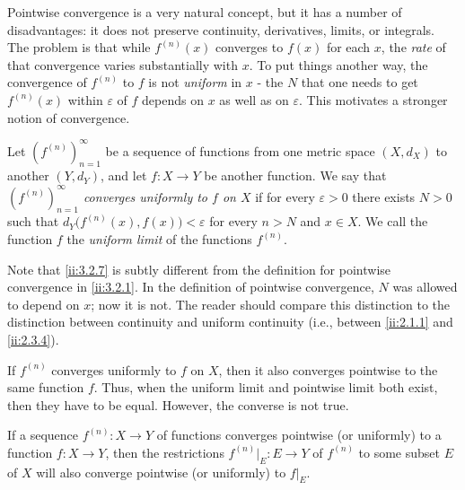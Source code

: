 \begin{note}
  Pointwise convergence is a very natural concept, but it has a number of disadvantages:
  it does not preserve continuity, derivatives, limits, or integrals.
  The problem is that while \(f^{(n)}(x)\) converges to \(f(x)\) for each \(x\), the \emph{rate} of that convergence varies substantially with \(x\).
  To put things another way, the convergence of \(f^{(n)}\) to \(f\) is not \emph{uniform} in \(x\)
  - the \(N\) that one needs to get \(f^{(n)}(x)\) within \(\varepsilon\) of \(f\) depends on \(x\) as well as on \(\varepsilon\).
  This motivates a stronger notion of convergence.
\end{note}

\setcounter{thm}{6}
\begin{defn}\label{ii:3.2.7}
  Let \((f^{(n)})_{n = 1}^\infty\) be a sequence of functions from one metric space \((X, d_X)\) to another \((Y, d_Y)\), and let \(f : X \to Y\) be another function.
  We say that \emph{\((f^{(n)})_{n = 1}^\infty\) converges uniformly to \(f\) on \(X\)} if for every \(\varepsilon > 0\) there exists \(N > 0\) such that \(d_Y\big(f^{(n)}(x), f(x)\big) < \varepsilon\) for every \(n > N\) and \(x \in X\).
  We call the function \(f\) the \emph{uniform limit} of the functions \(f^{(n)}\).
\end{defn}

\begin{rmk}\label{ii:3.2.8}
  Note that \cref{ii:3.2.7} is subtly different from the definition for pointwise convergence in \cref{ii:3.2.1}.
  In the definition of pointwise convergence, \(N\) was allowed to depend on \(x\);
  now it is not.
  The reader should compare this distinction to the distinction between continuity and uniform continuity
  (i.e., between \cref{ii:2.1.1} and \cref{ii:2.3.4}).
\end{rmk}

\begin{note}
  If \(f^{(n)}\) converges uniformly to \(f\) on \(X\), then it also converges pointwise to the same function \(f\).
  Thus, when the uniform limit and pointwise limit both exist, then they have to be equal.
  However, the converse is not true.
\end{note}

\begin{note}
  If a sequence \(f^{(n)} : X \to Y\) of functions converges pointwise (or uniformly) to a function \(f : X \to Y\), then the restrictions \(f^{(n)}|_E : E \to Y\) of \(f^{(n)}\) to some subset \(E\) of \(X\) will also converge pointwise (or uniformly) to \(f|_E\).
\end{note}

